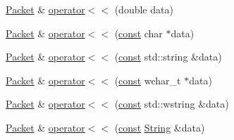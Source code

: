 \begin{DoxyCompactItemize}
\hyperlink{classsf_1_1_packet}{Packet} \& \hyperlink{classsf_1_1_packet_a3b3077720a486b569ac8e7dec638a3f0}{operator$<$$<$} (double data)
\item 
\hyperlink{classsf_1_1_packet}{Packet} \& \hyperlink{classsf_1_1_packet_a67c9985f7b3d6e90886e56e309280a9d}{operator$<$$<$} (\hyperlink{term__entry_8h_a57bd63ce7f9a353488880e3de6692d5a}{const} char $\ast$data)
\item 
\hyperlink{classsf_1_1_packet}{Packet} \& \hyperlink{classsf_1_1_packet_a59a21671caaa69da5d47c54b50e1eb54}{operator$<$$<$} (\hyperlink{term__entry_8h_a57bd63ce7f9a353488880e3de6692d5a}{const} std\-::string \&data)
\item 
\hyperlink{classsf_1_1_packet}{Packet} \& \hyperlink{classsf_1_1_packet_a6f7c6a9ce795fac342ea937896d98016}{operator$<$$<$} (\hyperlink{term__entry_8h_a57bd63ce7f9a353488880e3de6692d5a}{const} wchar\-\_\-t $\ast$data)
\item 
\hyperlink{classsf_1_1_packet}{Packet} \& \hyperlink{classsf_1_1_packet_a9f3401d038470f629d0c2c6be928a14b}{operator$<$$<$} (\hyperlink{term__entry_8h_a57bd63ce7f9a353488880e3de6692d5a}{const} std\-::wstring \&data)
\item 
\hyperlink{classsf_1_1_packet}{Packet} \& \hyperlink{classsf_1_1_packet_abc17272df082a36b202e10045bd9e220}{operator$<$$<$} (\hyperlink{term__entry_8h_a57bd63ce7f9a353488880e3de6692d5a}{const} \hyperlink{classsf_1_1_string}{String} \&data)
\end{DoxyCompactItemize}
